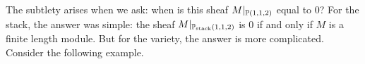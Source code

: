 \documentclass{amsart}
\begin{document}
The subtlety arises when we ask:  when is this sheaf $M|_{\mathbb P(1,1,2)}$ equal to $0$?  For the stack, the answer was simple: the sheaf $M|_{\mathbb P_{\text{stack}}(1,1,2)}$ is $0$ if and only if $M$ is a finite length module.  But
for the variety, the answer is more complicated.  Consider the following example.


%
%
%
\end{document}

